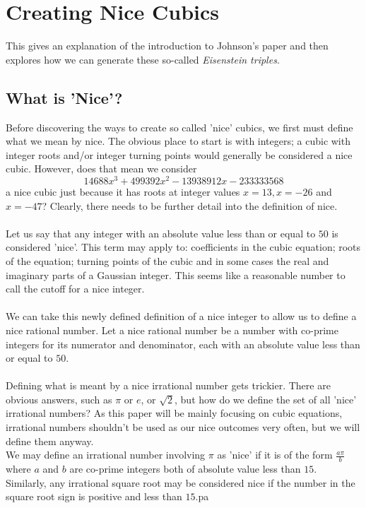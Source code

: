 \documentclass[12pt]{article}
\begin{document}
\pagebreak 

\section{Creating Nice Cubics}
This gives an explanation of the introduction to Johnson's paper and then explores how we can generate these so-called \textit{Eisenstein triples}.

\subsection{What is 'Nice'?}
Before discovering the ways to create so called 'nice' cubics, we first must define what we mean by nice. The obvious place to start is with integers; a cubic with integer roots and/or integer turning points would generally be considered a nice cubic. However, does that mean we consider $$14688x^3+499392x^2-13938912x-233333568$$ a nice cubic just because it has roots at integer values $x=13, x=-26$ and $x=-47$? Clearly, there needs to be further detail into the definition of nice.\\\\
Let us say that any integer with an absolute value less than or equal to $50$ is considered 'nice'. This term may apply to: coefficients in the cubic equation; roots of the equation; turning points of the cubic and in some cases the real and imaginary parts of a Gaussian integer. This seems like a reasonable number to call the cutoff for a nice integer.\\\\
We can take this newly defined definition of a nice integer to allow us to define a nice rational number. Let a nice rational number be a number with co-prime integers for its numerator and denominator, each with an absolute value less than or equal to $50$.\\\\
Defining what is meant by a nice irrational number gets trickier. There are obvious answers, such as $\pi$ or $e$, or $\sqrt{2}$, but how do we define the set of all 'nice' irrational numbers? As this paper will be mainly focusing on cubic equations, irrational numbers shouldn't be used as our nice outcomes very often, but we will define them anyway.\\
We may define an irrational number involving $\pi$ as 'nice' if it is of the form $\frac{a\pi}{b}$ where $a$ and $b$ are co-prime integers both of absolute value less than $15$.\\
Similarly, any irrational square root may be considered nice if the number in the square root sign is positive and less than $15$.pa
\end{document}

